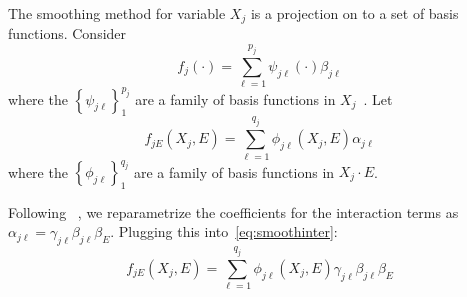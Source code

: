 \documentclass[12pt,letter]{article}
\begin{document}
The smoothing method for variable $X_j$ is a projection on to a set of basis functions. Consider
\begin{equation}
f_j(\cdot) = \sum_{\ell = 1}^{p_j} \psi_{j\ell}(\cdot) \beta_{j\ell} \label{eq:smooth}
\end{equation}
where the $\left\lbrace \psi_{j\ell} \right\rbrace_1^{p_j}$ are a family of basis functions in $X_j$~\citep{hastie2015statistical}. 
Let 
\begin{equation}
f_{jE}(X_{j}, E) = \sum_{\ell = 1}^{q_j} \phi_{j\ell}(X_j, E) \alpha_{j\ell} \label{eq:smoothinter}
\end{equation}
where the $\left\lbrace \phi_{j\ell} \right\rbrace_1^{q_j}$ are a family of basis functions in $X_j\cdot E$.

Following ~\citep{choi2010variable}, we reparametrize the coefficients for the interaction terms as $\alpha_{j\ell} = \gamma_{j\ell} \beta_{j\ell} \beta_E$. Plugging this into~\eqref{eq:smoothinter}:
\begin{equation}
f_{jE}(X_{j}, E) = \sum_{\ell = 1}^{q_j} \phi_{j\ell}(X_j, E) \gamma_{j\ell} \beta_{j\ell} \beta_E \label{eq:smoothinter2}
\end{equation}






\newpage
%


\end{document}
